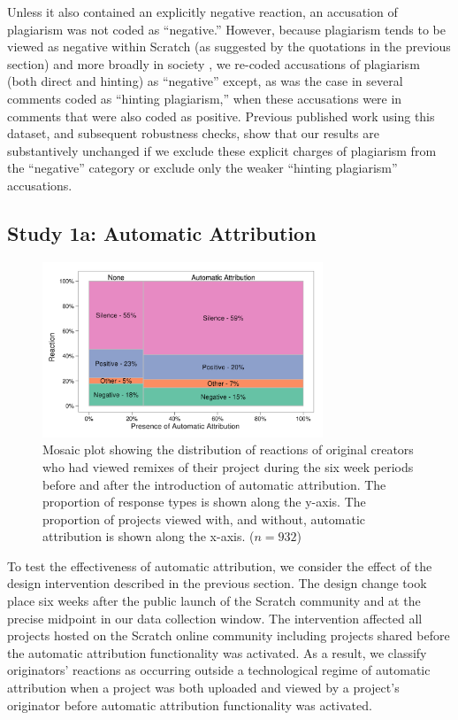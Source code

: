 Unless it also contained an explicitly negative reaction, an
accusation of plagiarism was not coded as ``negative.''  However,
because plagiarism tends to be viewed as negative within
Scratch (as suggested by the quotations in the previous section) and
more broadly in society \cite{posner_little_2007}, we re-coded
accusations of plagiarism (both direct and hinting) as ``negative''
except, as was the case in several comments coded as ``hinting
plagiarism,'' when these accusations were in comments that were also
coded as positive. Previous published work using this dataset, and
subsequent robustness checks, show that our results are substantively
unchanged if we exclude these explicit charges of plagiarism from the
``negative'' category or exclude only the weaker ``hinting
plagiarism'' accusations.

\subsection{Study 1a: Automatic Attribution}

\begin{figure}
\begin{center}
\includegraphics[width=3.3in]{figures/mosaic_automatic_attribution.png}
\caption{Mosaic plot showing the distribution of reactions of original
  creators who had viewed remixes of their project during the six week
  periods before and after the introduction of automatic
  attribution. The proportion of response types is shown along the
  y-axis. The proportion of projects viewed with, and without,
  automatic attribution is shown along the x-axis. ($n=932$)}
\label{fig:mosauto}
\end{center}
\end{figure}

To test the effectiveness of automatic attribution, we consider the
effect of the design intervention described in the previous section.
The design change took place six weeks after the public launch of the
Scratch community and at the precise midpoint in our data collection
window. The intervention affected all projects hosted on the Scratch
online community including projects shared before the automatic
attribution functionality was activated. As a result, we classify
originators' reactions as occurring outside a technological regime of
automatic attribution when a project was both uploaded and viewed by a
project's originator before automatic attribution functionality was
activated.

